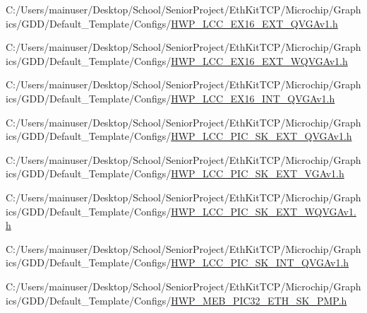 \begin{DoxyCompactItemize}
C\+:/\+Users/mainuser/\+Desktop/\+School/\+Senior\+Project/\+Eth\+Kit\+T\+C\+P/\+Microchip/\+Graphics/\+G\+D\+D/\+Default\+\_\+\+Template/\+Configs/\hyperlink{_h_w_p___l_c_c___e_x16___e_x_t___q_v_g_av1_8h}{H\+W\+P\+\_\+\+L\+C\+C\+\_\+\+E\+X16\+\_\+\+E\+X\+T\+\_\+\+Q\+V\+G\+Av1.\+h}\item 
C\+:/\+Users/mainuser/\+Desktop/\+School/\+Senior\+Project/\+Eth\+Kit\+T\+C\+P/\+Microchip/\+Graphics/\+G\+D\+D/\+Default\+\_\+\+Template/\+Configs/\hyperlink{_h_w_p___l_c_c___e_x16___e_x_t___w_q_v_g_av1_8h}{H\+W\+P\+\_\+\+L\+C\+C\+\_\+\+E\+X16\+\_\+\+E\+X\+T\+\_\+\+W\+Q\+V\+G\+Av1.\+h}\item 
C\+:/\+Users/mainuser/\+Desktop/\+School/\+Senior\+Project/\+Eth\+Kit\+T\+C\+P/\+Microchip/\+Graphics/\+G\+D\+D/\+Default\+\_\+\+Template/\+Configs/\hyperlink{_h_w_p___l_c_c___e_x16___i_n_t___q_v_g_av1_8h}{H\+W\+P\+\_\+\+L\+C\+C\+\_\+\+E\+X16\+\_\+\+I\+N\+T\+\_\+\+Q\+V\+G\+Av1.\+h}\item 
C\+:/\+Users/mainuser/\+Desktop/\+School/\+Senior\+Project/\+Eth\+Kit\+T\+C\+P/\+Microchip/\+Graphics/\+G\+D\+D/\+Default\+\_\+\+Template/\+Configs/\hyperlink{_h_w_p___l_c_c___p_i_c___s_k___e_x_t___q_v_g_av1_8h}{H\+W\+P\+\_\+\+L\+C\+C\+\_\+\+P\+I\+C\+\_\+\+S\+K\+\_\+\+E\+X\+T\+\_\+\+Q\+V\+G\+Av1.\+h}\item 
C\+:/\+Users/mainuser/\+Desktop/\+School/\+Senior\+Project/\+Eth\+Kit\+T\+C\+P/\+Microchip/\+Graphics/\+G\+D\+D/\+Default\+\_\+\+Template/\+Configs/\hyperlink{_h_w_p___l_c_c___p_i_c___s_k___e_x_t___v_g_av1_8h}{H\+W\+P\+\_\+\+L\+C\+C\+\_\+\+P\+I\+C\+\_\+\+S\+K\+\_\+\+E\+X\+T\+\_\+\+V\+G\+Av1.\+h}\item 
C\+:/\+Users/mainuser/\+Desktop/\+School/\+Senior\+Project/\+Eth\+Kit\+T\+C\+P/\+Microchip/\+Graphics/\+G\+D\+D/\+Default\+\_\+\+Template/\+Configs/\hyperlink{_h_w_p___l_c_c___p_i_c___s_k___e_x_t___w_q_v_g_av1_8h}{H\+W\+P\+\_\+\+L\+C\+C\+\_\+\+P\+I\+C\+\_\+\+S\+K\+\_\+\+E\+X\+T\+\_\+\+W\+Q\+V\+G\+Av1.\+h}\item 
C\+:/\+Users/mainuser/\+Desktop/\+School/\+Senior\+Project/\+Eth\+Kit\+T\+C\+P/\+Microchip/\+Graphics/\+G\+D\+D/\+Default\+\_\+\+Template/\+Configs/\hyperlink{_h_w_p___l_c_c___p_i_c___s_k___i_n_t___q_v_g_av1_8h}{H\+W\+P\+\_\+\+L\+C\+C\+\_\+\+P\+I\+C\+\_\+\+S\+K\+\_\+\+I\+N\+T\+\_\+\+Q\+V\+G\+Av1.\+h}\item 
C\+:/\+Users/mainuser/\+Desktop/\+School/\+Senior\+Project/\+Eth\+Kit\+T\+C\+P/\+Microchip/\+Graphics/\+G\+D\+D/\+Default\+\_\+\+Template/\+Configs/\hyperlink{_h_w_p___m_e_b___p_i_c32___e_t_h___s_k__16_p_m_p_8h}{H\+W\+P\+\_\+\+M\+E\+B\+\_\+\+P\+I\+C32\+\_\+\+E\+T\+H\+\_\+\+S\+K\+\_\+P\+M\+P.\+h}\item 

\end{DoxyCompactItemize}
